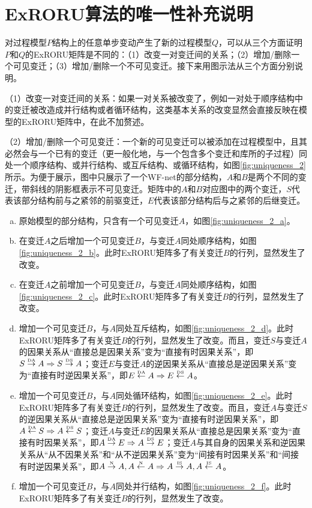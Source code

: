 
\chapter{ExRORU算法的唯一性补充说明}
\label{app:uniqueness}
对过程模型$P$结构上的任意单步变动产生了新的过程模型$Q$，可以从三个方面证明$P$和$Q$的ExRORU矩阵是不同的：（1）改变一对变迁间的关系；（2）增加/删除一个可见变迁；（3）增加/删除一个不可见变迁。接下来用图示法从三个方面分别说明。

{\heiti（1）改变一对变迁间的关系：}如果一对关系被改变了，例如一对处于顺序结构中的变迁被改造成并行结构或者循环结构，这类基本关系的改变显然会直接反映在模型的ExRORU矩阵中，在此不加赘述。

{\heiti（2）增加/删除一个可见变迁：}一个新的可见变迁可以被添加在过程模型中，且其必然会与一个已有的变迁（更一般化地，与一个包含多个变迁和库所的子过程）同处一个顺序结构、或并行结构、或互斥结构、或循环结构，如图\ref{fig:uniqueness_2}所示。为便于展示，图中只展示了一个WF-net的部分结构，$A$和$B$是两个不同的变迁，带斜线的阴影框表示不可见变迁。矩阵中的$A$和$B$对应图中的两个变迁，$S$代表该部分结构前与之紧邻的前驱变迁，$E$代表该部分结构后与之紧邻的后继变迁。
\begin{enumerate}[(a)]
  \item 原始模型的部分结构，只含有一个可见变迁$A$，如图\ref{fig:uniqueness_2_a}。
  \item 在变迁$A$之后增加一个可见变迁$B$，与变迁$A$同处顺序结构，如图\ref{fig:uniqueness_2_b}。此时ExRORU矩阵多了有关变迁$B$的行列，显然发生了改变。
  \item 在变迁$A$之前增加一个可见变迁$B$，与变迁$A$同处顺序结构，如图\ref{fig:uniqueness_2_c}。此时ExRORU矩阵多了有关变迁$B$的行列，显然发生了改变。
  \item 增加一个可见变迁$B$，与$A$同处互斥结构，如图\ref{fig:uniqueness_2_d}。此时ExRORU矩阵多了有关变迁$B$的行列，显然发生了改变。而且，变迁$S$与变迁$A$的因果关系从“直接总是因果关系”变为“直接有时因果关系”，即$S\overset{\text{\tiny{DA}}}{\rightarrow}A\Rightarrow S\overset{\text{\tiny{DS}}}{\rightarrow}A$；变迁$E$与变迁$A$的逆因果关系从“直接总是逆因果关系”变为“直接有时逆因果关系”，即$E\overset{\text{\tiny{DA}}}{\leftarrow}A\Rightarrow E\overset{\text{\tiny{DS}}}{\leftarrow}A$。
  \item 增加一个可见变迁$B$，与$A$同处循环结构，如图\ref{fig:uniqueness_2_e}。此时ExRORU矩阵多了有关变迁$B$的行列，显然发生了改变。而且，变迁$A$与变迁$S$的逆因果关系从“直接总是逆因果关系”变为“直接有时逆因果关系”，即$A\overset{\text{\tiny{DA}}}{\leftarrow}S\Rightarrow A\overset{\text{\tiny{DS}}}{\leftarrow}S$；变迁$A$与变迁$E$的因果关系从“直接总是因果关系”变为“直接有时因果关系”，即$A\overset{\text{\tiny{DA}}}{\rightarrow}E\Rightarrow A\overset{\text{\tiny{DS}}}{\rightarrow}E$；变迁$A$与其自身的因果关系和逆因果关系从“从不因果关系”和“从不逆因果关系”变为“间接有时因果关系”和“间接有时逆因果关系”，即$A\overset{\text{\tiny{N}}}{\rightarrow}A,A\overset{\text{\tiny{N}}}{\leftarrow}A\Rightarrow A\overset{\text{\tiny{IS}}}{\rightarrow}A,A\overset{\text{\tiny{IS}}}{\leftarrow}A$。
  \item 增加一个可见变迁$B$，与$A$同处并行结构，如图\ref{fig:uniqueness_2_f}。此时ExRORU矩阵多了有关变迁$B$的行列，显然发生了改变。
\end{enumerate}
